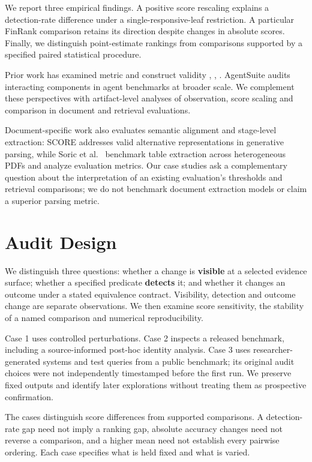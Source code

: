 \documentclass[conference]{IEEEtran}
\begin{document}
We report three empirical findings. A positive score rescaling explains
a detection-rate difference under a single-responsive-leaf restriction.
A particular FinRank comparison retains its direction despite changes in
absolute scores. Finally, we distinguish point-estimate rankings from
comparisons supported by a specified paired statistical procedure.

Prior work has examined metric and construct validity \cite{r3},
\cite{r4}, \cite{r5}. AgentSuite \cite{r6} audits interacting components
in agent benchmarks at broader scale. We complement these perspectives
with artifact-level analyses of observation, score scaling and
comparison in document and retrieval evaluations.

Document-specific work also evaluates semantic alignment and stage-level
extraction: SCORE \cite{r7} addresses valid alternative representations
in generative parsing, while Soric et al.~\cite{r8} benchmark table
extraction across heterogeneous PDFs and analyze evaluation metrics. Our
case studies ask a complementary question about the interpretation of an
existing evaluation's thresholds and retrieval comparisons; we do not
benchmark document extraction models or claim a superior parsing metric.

\section{Audit Design}\label{audit-design}

We distinguish three questions: whether a change is \textbf{visible} at
a selected evidence surface; whether a specified predicate
\textbf{detects} it; and whether it changes an outcome under a stated
equivalence contract. Visibility, detection and outcome change are
separate observations. We then examine score sensitivity, the stability
of a named comparison and numerical reproducibility.

Case 1 uses controlled perturbations. Case 2 inspects a released
benchmark, including a source-informed post-hoc identity analysis. Case
3 uses researcher-generated systems and test queries from a public
benchmark; its original audit choices were not independently timestamped
before the first run. We preserve fixed outputs and identify later
explorations without treating them as prospective confirmation.

The cases distinguish score differences from supported comparisons. A
detection-rate gap need not imply a ranking gap, absolute accuracy
changes need not reverse a comparison, and a higher mean need not
establish every pairwise ordering. Each case specifies what is held
fixed and what is varied.
\end{document}
